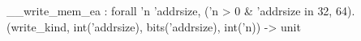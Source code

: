 __write_mem_ea : forall 'n 'addrsize, ('n > 0 & 'addrsize in {32, 64}).
  (write_kind, int('addrsize), bits('addrsize), int('n)) -> unit